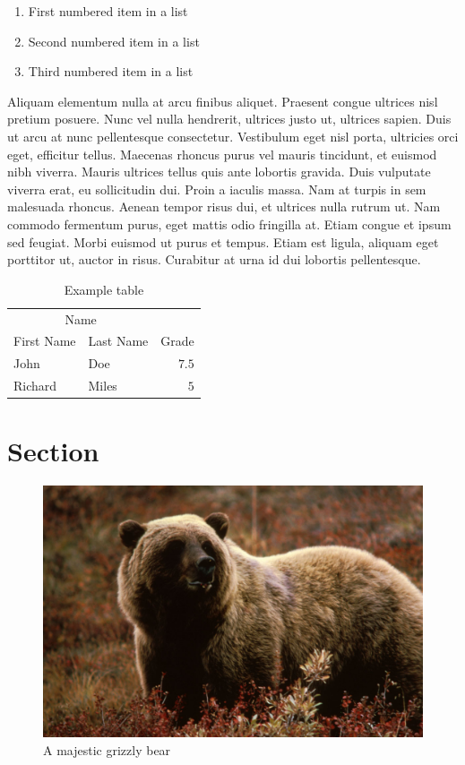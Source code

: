 \documentclass[10pt, a4paper, twocolumn]{article} %
\begin{document}
\begin{enumerate}
	\item First numbered item in a list
	\item Second numbered item in a list
	\item Third numbered item in a list
\end{enumerate}

Aliquam elementum nulla at arcu finibus aliquet. Praesent congue ultrices nisl pretium posuere. Nunc vel nulla hendrerit, ultrices justo ut, ultrices sapien. Duis ut arcu at nunc pellentesque consectetur. Vestibulum eget nisl porta, ultricies orci eget, efficitur tellus. Maecenas rhoncus purus vel mauris tincidunt, et euismod nibh viverra. Mauris ultrices tellus quis ante lobortis gravida. Duis vulputate viverra erat, eu sollicitudin dui. Proin a iaculis massa. Nam at turpis in sem malesuada rhoncus. Aenean tempor risus dui, et ultrices nulla rutrum ut. Nam commodo fermentum purus, eget mattis odio fringilla at. Etiam congue et ipsum sed feugiat. Morbi euismod ut purus et tempus. Etiam est ligula, aliquam eget porttitor ut, auctor in risus. Curabitur at urna id dui lobortis pellentesque.

\begin{table}
	\caption{Example table}
	\centering
	\begin{tabular}{llr}
		\toprule
		\multicolumn{2}{c}{Name} \\
		\cmidrule(r){1-2}
		First Name & Last Name & Grade \\
		\midrule
		John & Doe & $7.5$ \\
		Richard & Miles & $5$ \\
		\bottomrule
	\end{tabular}
\end{table}


\section{Section}

\begin{figure}
	\includegraphics[width=\linewidth]{bear.jpg} %
	\caption{A majestic grizzly bear} %
	\label{bear} %
\end{figure}
\end{document}
